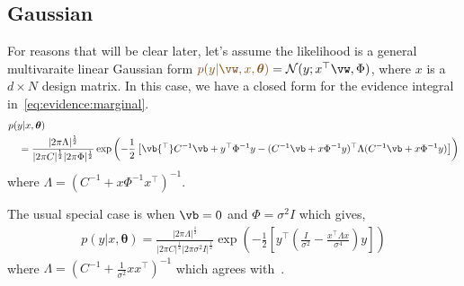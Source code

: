 \documentclass{article}
\newcounter{ct}
\newcommand{\inv}{^{-1}}
\newcommand{\trp}{{^\top}} %
\newcommand{\Gaussian}{\ensuremath{\mathcal{N}}} %
\newcommand{\weight}{\vw}
\newcommand{\hyp}{\bm{\theta}}
\newcommand{\likelihood}{\ensuremath{\textcolor{goldenbrown}{p(y|\weight,x,\hyp)}}}
\begin{document}
\subsection{Gaussian}
For reasons that will be clear later, let's assume the likelihood is a general multivaraite linear Gaussian form $\likelihood = \Gaussian(y; x\trp \weight, \Phi)$, where $x$ is a $d \times N$ design matrix.
In this case, we have a closed form for the evidence integral in~\eqref{eq:evidence:marginal}.
\begin{align}
    &p(y|x,\hyp) \nonumber\\
    &\quad=
    \frac{|2\pi\Lambda|^{\frac{1}{2}}}
    {|2\pi C|^{\frac{1}{2}} |2\pi \Phi|^{\frac{1}{2}}}
    \exp\left(
	-\frac{1}{2}
	\left[
	    \vb\trp C\inv \vb + y\trp\Phi\inv y
	    - (C\inv \vb + x\Phi\inv y)\trp 
		\Lambda
		(C\inv \vb + x\Phi\inv y)
	\right]
    \right)
\end{align}
where $\Lambda = \left( C\inv + x\Phi\inv x\trp \right)\inv$.

The usual special case is when $\vb = 0$ and $\Phi = \sigma^2 I$ which gives,
\begin{align}
    p(y|x,\hyp) =
    \frac{|2\pi\Lambda|^{\frac{1}{2}}}
    {|2\pi C|^{\frac{1}{2}} |2\pi \sigma^2 I|^{\frac{1}{2}}}
    \exp\left(
	-\frac{1}{2}
	\left[
	    y\trp 
	    \left(
		\frac{I}{\sigma^2}
		-
		\frac{
		    x\trp 
		    \Lambda
		    x
		}{\sigma^4}
	    \right)
	    y
	\right]
    \right)
\end{align}
where $\Lambda = \left( C\inv + \frac{1}{\sigma^2}x x\trp \right)\inv$ which agrees with~\cite{Sahani2002}.




\end{document}
